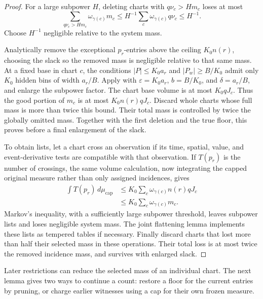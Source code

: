 \begin{proof}
For a large subpower \(H\), deleting charts with
\(q\nu_c>Hm_c\) loses at most
\[
 \sum_{q\nu_c>Hm_c}\omega_{\gamma(c)}m_c
 \le H^{-1}\sum_c\omega_{\gamma(c)}q\nu_c\le H^{-1}.
\]
Choose \(H^{-1}\) negligible relative to the system mass.

Analytically remove the exceptional \(p_r\)-entries above the
ceiling \(K_0n(r)\), choosing the slack so the removed mass is
negligible relative to that same mass.
At a fixed base in chart \(c\), the conditions
\(|P|\le K_0a_r\) and \(|P_w|\ge B/K_0\) admit only \(K_0\)
hidden bins of width \(a_r/B\).
Apply  with
\(\varepsilon=K_0a_r\), \(b=B/K_0\), and
\(\delta=a_r/B\), and enlarge the subpower factor.
The chart base volume is at most \(K_0qJ_c\).
Thus the good portion of \(m_c\) is at most \(K_0n(r)qJ_c\).
Discard whole charts whose full mass is more than twice this
bound.  Their total mass is controlled by twice the globally
omitted mass.  Together with the first deletion and the true
floor, this proves  before a final
enlargement of the slack.

To obtain lists, let a chart cross an observation if its time,
spatial, value, and event-derivative tests are compatible with
that observation.  If \(T(p_r)\) is the number of crossings,
the same volume calculation, now integrating the capped
original measure rather than only assigned incidences, gives
\begin{align*}
 \int T(p_r)\,d\mu_{\mathrm{cap}}
 &\le K_0\sum_c\omega_{\gamma(c)}n(r)qJ_c\\
 &\le K_0\sum_c\omega_{\gamma(c)}m_c.
\end{align*}
Markov's inequality, with a sufficiently large subpower
threshold, leaves subpower lists and loses negligible system
mass.  The joint flattening lemma implements these lists
as tempered tables if necessary.
Finally discard charts that lost more than half their
selected mass in these operations.  Their total loss is
at most twice the removed incidence mass, and
 survives with enlarged slack.
\end{proof}

Later restrictions can reduce the selected mass of an individual
chart. The next lemma gives two ways to continue a count: restore
a floor for the current entries by pruning, or charge earlier
witnesses using a cap for their own frozen measure.

